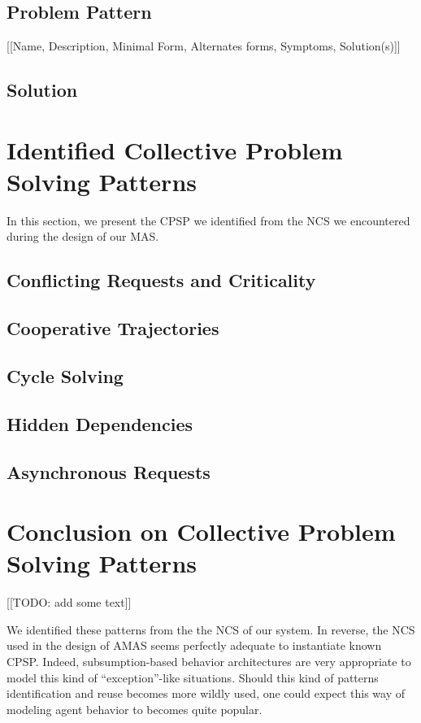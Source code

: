 \subsection{Problem Pattern}

[[Name, Description, Minimal Form, Alternates forms, Symptoms, Solution(s)]]

\subsection{Solution}

\section{Identified Collective Problem Solving Patterns}

In this section, we present the CPSP we identified from the NCS we encountered during the design of our MAS.

\subsection{Conflicting Requests and Criticality}

\subsection{Cooperative Trajectories}

\subsection{Cycle Solving}

\subsection{Hidden Dependencies}

\subsection{Asynchronous Requests}

\section{Conclusion on Collective Problem Solving Patterns}

[[TODO: add some text]]

We identified these patterns from the the NCS of our system. In reverse, the NCS used in the design of AMAS seems perfectly adequate to instantiate known CPSP. Indeed, subsumption-based behavior architectures are very appropriate to model this kind of \enquote{exception}-like situations. Should this kind of patterns identification and reuse becomes more wildly used, one could expect this way of modeling agent behavior to becomes quite popular.